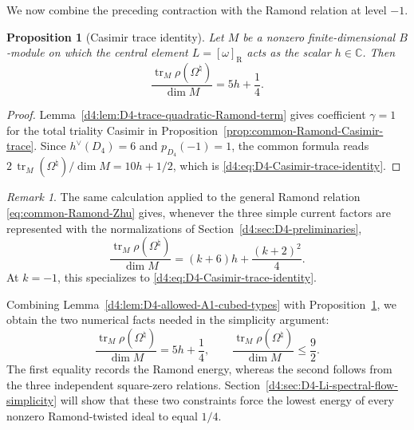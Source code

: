 \documentclass[11pt,reqno]{amsart}
\newtheorem{proposition}[theorem]{Proposition}
\theoremstyle{definition}
\theoremstyle{remark}
\newtheorem{remark}[theorem]{Remark}
\begin{document}
We now combine the preceding contraction with the Ramond relation at
level \(-1\).

\begin{proposition}[Casimir trace identity]
\label{d4:prop:D4-Casimir-trace-identity}
Let \(M\) be a nonzero finite-dimensional \(B\)-module on which the
central element \(L=[\omega]_{\mathrm R}\) acts as the scalar
\(h\in\mathbb C\).  Then
\begin{equation}
  \frac{\operatorname{tr}_M\rho(\Omega^\natural)}{\dim M}
  =5h+\frac14.
  \label{d4:eq:D4-Casimir-trace-identity}
\end{equation}
\end{proposition}

\begin{proof}
Lemma~\ref{d4:lem:D4-trace-quadratic-Ramond-term} gives coefficient
$\gamma=1$ for the total triality Casimir in
Proposition~\ref{prop:common-Ramond-Casimir-trace}.  Since
$h^\vee(D_4)=6$ and $p_{D_4}(-1)=1$, the common formula reads
$2\,\operatorname{tr}_M(\Omega^\natural)/\dim M=10h+1/2$, which is
\eqref{d4:eq:D4-Casimir-trace-identity}.
\end{proof}

\begin{remark}

The same calculation applied to the general Ramond relation
\eqref{eq:common-Ramond-Zhu} gives, whenever the three
simple current factors are represented with the normalizations of
Section~\ref{d4:sec:D4-preliminaries},
\begin{equation*}
  \frac{\operatorname{tr}_M\rho(\Omega^\natural)}{\dim M}
  =(k+6)h+\frac{(k+2)^2}{4}.
\end{equation*}
At \(k=-1\), this specializes to
\eqref{d4:eq:D4-Casimir-trace-identity}.
\end{remark}

Combining Lemma~\ref{d4:lem:D4-allowed-A1-cubed-types} with
Proposition~\ref{d4:prop:D4-Casimir-trace-identity}, we obtain the two
numerical facts needed in the simplicity argument:
\begin{equation}
  \frac{\operatorname{tr}_M\rho(\Omega^\natural)}{\dim M}
  =5h+\frac14,
  \qquad
  \frac{\operatorname{tr}_M\rho(\Omega^\natural)}{\dim M}
  \le\frac92.
  \label{d4:eq:D4-trace-identity-and-Casimir-upper-bound}
\end{equation}
The first equality records the Ramond energy, whereas the second follows
from the three independent square-zero relations.  Section~\ref{d4:sec:D4-Li-spectral-flow-simplicity} will show
that these two constraints force the lowest energy of every nonzero
Ramond-twisted ideal to equal \(1/4\).
\end{document}
